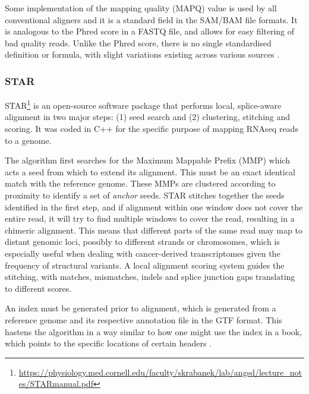 Some implementation of the mapping quality (MAPQ) value is used by all conventional aligners and it is a standard field in the SAM/BAM file formats. It is analogous to the Phred score in a FASTQ file, and allows for easy filtering of bad quality reads. Unlike the Phred score, there is no single standardised definition or formula, with slight variations existing across various sources \citep{andrews2016mapq}.


\subsubsection{STAR}

\ac{STAR}\footnote{\url{https://physiology.med.cornell.edu/faculty/skrabanek/lab/angsd/lecture_notes/STARmanual.pdf}} \citep{Dobin2013} is an open-source software package that performs local, splice-aware alignment in two major steps: (1) seed search and (2) clustering, stitching and scoring. It was coded in C++ for the specific purpose of mapping RNAseq reads to a genome.

The algorithm first searches for the Maximum Mappable Prefix (MMP) which acts a seed from which to extend its alignment. This must be an exact identical match with the reference genome. These MMPs are clustered according to proximity to identify a set of \textit{anchor} seeds. \ac{STAR} stitches together the seeds identified in the first step, and if alignment within one window does not cover the entire read, it will try to find multiple windows to cover the read, resulting in a chimeric alignment. This means that different parts of the same read may map to distant genomic loci, possibly to different strands or chromosomes, which is especially useful when dealing with cancer-derived transcriptomes given the frequency of structural variants. A local alignment scoring system guides the stitching, with matches, mismatches, indels and splice junction gaps translating to different scores.

An index must be generated prior to alignment, which is generated from a reference genome and its respective annotation file in the GTF format. This hastens the algorithm in a way similar to how one might use the index in a book, which points to the specific locations of certain headers \citep{trapnell2009map}.


